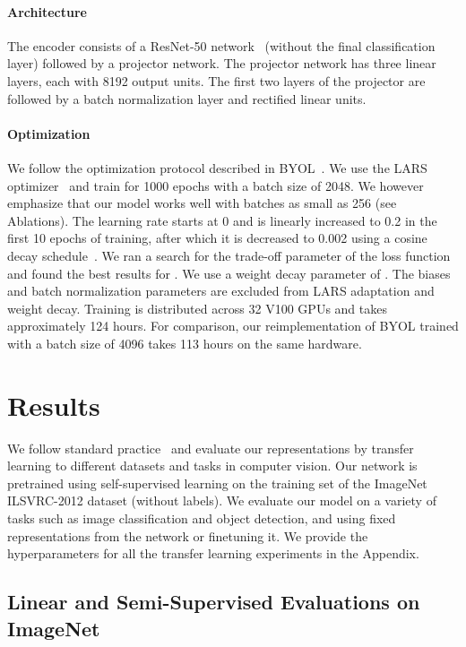 \documentclass{article}
\begin{document}
\paragraph{Architecture} 
The encoder  consists of a ResNet-50 network~\cite{he2016deep} (without the final classification layer) followed by a projector network. The projector network has three linear layers, each with 8192 output units. The first two layers of the projector are followed by a batch normalization layer and rectified linear units.

\paragraph{Optimization} 
We follow the optimization protocol described in \textsc{BYOL}~\cite{grill2020bootstrap}. We use the LARS optimizer~\cite{you2017large} and train for 1000 epochs with a batch size of 2048. We however emphasize that our model works well with batches as small as 256 (see Ablations). The learning rate starts at 0 and is linearly increased to 0.2 in the first 10 epochs of training, after which it is decreased to 0.002 using a cosine decay schedule~\cite{loshchilov2016sgdr}. We ran a search for the trade-off parameter  of the loss function and found the best results for . We use a weight decay parameter of . The biases and batch normalization parameters are excluded from LARS adaptation and weight decay. Training is distributed across 32 V100 GPUs and takes approximately 124 hours. For comparison, our reimplementation of \textsc{BYOL} trained with a batch size of 4096 takes 113 hours on the same hardware. \section{Results}

We follow standard practice~\cite{goyal2019scaling} and evaluate our representations by transfer learning to different datasets and tasks in computer vision.
Our network is pretrained using self-supervised learning on the training set of the ImageNet ILSVRC-2012 dataset \cite{deng2009imagenet} (without labels). We evaluate our model on a variety of tasks such as image classification and object detection, and using fixed representations from the network or finetuning it. We provide the hyperparameters for all the transfer learning experiments in the Appendix.


\subsection{Linear and Semi-Supervised Evaluations on ImageNet}
\end{document}
